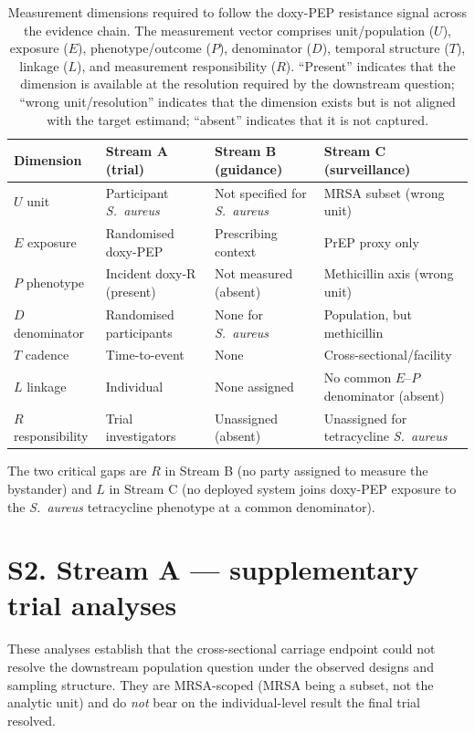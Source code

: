 \documentclass[11pt,a4paper]{article}
\newcommand{\sa}{\emph{S.~aureus}}
\begin{document}
\begin{table}[htbp]
\centering
\caption{Measurement dimensions required to follow the doxy-PEP resistance signal across the evidence chain.
The measurement vector comprises unit/population ($U$), exposure ($E$), phenotype/outcome ($P$), denominator ($D$), temporal structure ($T$), linkage ($L$), and measurement responsibility ($R$). ``Present'' indicates that the dimension is available at the resolution required by the downstream question; ``wrong unit/resolution'' indicates that the dimension exists but is not aligned with the target estimand; ``absent'' indicates that it is not captured.}
\label{tab:vector}
\small
\begin{tabularx}{\textwidth}{@{}lXXX@{}}
\toprule
Dimension & Stream A (trial) & Stream B (guidance) & Stream C (surveillance)\\
\midrule
$U$ unit & Participant \sa{} & Not specified for \sa{} & MRSA subset (wrong unit)\\
$E$ exposure & Randomised doxy-PEP & Prescribing context & PrEP proxy only\\
$P$ phenotype & Incident doxy-R (present) & Not measured (absent) & Methicillin axis (wrong unit)\\
$D$ denominator & Randomised participants & None for \sa{} & Population, but methicillin\\
$T$ cadence & Time-to-event & None & Cross-sectional/facility\\
$L$ linkage & Individual & None assigned & No common $E$--$P$ denominator (absent)\\
$R$ responsibility & Trial investigators & Unassigned (absent) & Unassigned for tetracycline \sa{}\\
\bottomrule
\end{tabularx}
\end{table}

The two critical gaps are $R$ in Stream B (no party assigned to measure the
bystander) and $L$ in Stream C (no deployed system joins doxy-PEP exposure to the
\sa{} tetracycline phenotype at a common denominator).

\section*{S2. Stream A --- supplementary trial analyses}

These analyses establish that the cross-sectional carriage endpoint could not
resolve the downstream population question under the observed designs and sampling
structure. They are MRSA-scoped (MRSA being a subset, not the analytic unit) and
do \emph{not} bear on the individual-level result the final trial
resolved.
\end{document}
